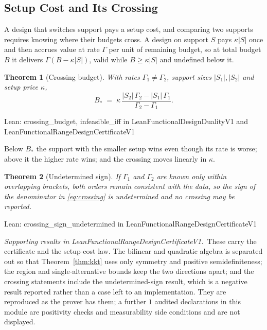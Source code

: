 \documentclass[conference]{IEEEtran}
\newtheorem{theorem}{Theorem}
\theoremstyle{definition}
\newcommand{\lean}[1]{\textsf{\footnotesize #1}}
\newcommand{\leanbox}[1]{%
  \par\vspace{2pt}\noindent
  {\footnotesize\textsf{Lean: #1}}\par\vspace{2pt}}
\begin{document}
\subsection{Setup Cost and Its Crossing}
\label{sec:setup}

A design that switches support pays a setup cost, and comparing two supports requires knowing
where their budgets cross. A design on support $S$ pays $\kappa|S|$ once and then accrues
value at rate $\Gamma$ per unit of remaining budget, so at total budget $B$ it delivers
$\Gamma(B-\kappa|S|)$, valid while $B\ge\kappa|S|$ and undefined below it.

\begin{theorem}[Crossing budget]
\label{thm:crossing}
With rates $\Gamma_{1}\neq\Gamma_{2}$, support sizes $|S_{1}|,|S_{2}|$ and setup price
$\kappa$,
\begin{equation}
B_{*}\;=\;\kappa\,\frac{|S_{2}|\,\Gamma_{2}-|S_{1}|\,\Gamma_{1}}{\Gamma_{2}-\Gamma_{1}} .
\label{eq:crossing}
\end{equation}
\end{theorem}

\leanbox{\lean{crossing\_budget}, \lean{infeasible\_iff} in
\lean{LeanFunctionalDesignDualityV1} and
\lean{LeanFunctionalRangeDesignCertificateV1}}

Below $B_{*}$ the support with the smaller setup wins even though its rate is worse; above it
the higher rate wins; and the crossing moves linearly in $\kappa$.

\begin{theorem}[Undetermined sign]
\label{thm:undecided}
If $\Gamma_{1}$ and $\Gamma_{2}$ are known only within overlapping brackets, both orders
remain consistent with the data, so the sign of the denominator in \eqref{eq:crossing} is
undetermined and no crossing may be reported.
\end{theorem}

\leanbox{\lean{crossing\_sign\_undetermined} in
\lean{LeanFunctionalRangeDesignCertificateV1}}

\noindent\emph{Supporting results in \lean{LeanFunctionalRangeDesignCertificateV1}.}~These carry the certificate and the setup-cost law. The bilinear and quadratic algebra is separated out so that Theorem~\ref{thm:kkt} uses only symmetry and positive semidefiniteness; the region and single-alternative bounds keep the two directions apart; and the crossing statements include the undetermined-sign result, which is a negative result reported rather than a case left to an implementation. They are reproduced as the prover has them; a further $1$ audited declarations in this module are positivity checks and measurability side conditions and are not displayed.
\end{document}
